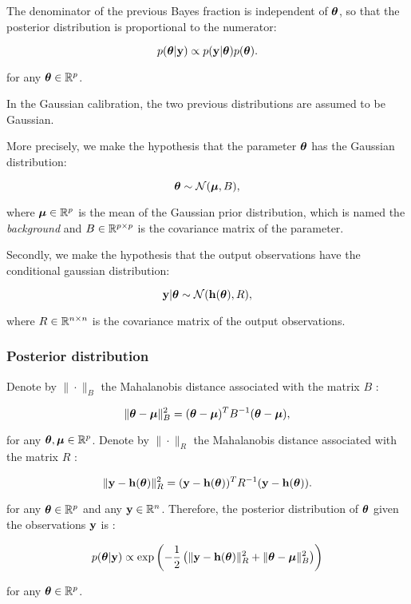\documentclass{beamer}
\begin{document}
\begin{frame}

The denominator of the previous Bayes fraction is independent of
$\boldsymbol{\theta}$, so that the posterior distribution is
proportional to the numerator:

$$
p(\boldsymbol{\theta} | {\bf y}) \propto  p({\bf y} | \boldsymbol{\theta}) p(\boldsymbol{\theta}).
$$

for any $\boldsymbol{\theta}\in\mathbb{R}^p$.

In the Gaussian calibration, the two previous distributions are assumed
to be Gaussian.

More precisely, we make the hypothesis that the parameter
$\boldsymbol{\theta}$ has the Gaussian distribution:

$$
\boldsymbol{\theta} \sim \mathcal{N}(\boldsymbol{\mu}, B),
$$

where $\boldsymbol{\mu}\in\mathbb{R}^p$ is the mean of the Gaussian prior
distribution, which is named the \emph{background} and
$B\in\mathbb{R}^{p \times p}$ is the covariance matrix of the
parameter.

\end{frame}

\begin{frame}
Secondly, we make the hypothesis that the output observations have the
conditional gaussian distribution:

$$
{\bf y} | \boldsymbol{\theta} \sim \mathcal{N}({\bf h}(\boldsymbol{\theta}), R),
$$

where $R\in\mathbb{R}^{n \times n}$ is the covariance matrix of the
output observations.
\end{frame}


\begin{frame}
\frametitle{Posterior distribution}

Denote by $\|\cdot\|_B$ the Mahalanobis distance associated with
the matrix $B$ :

$$
\|\boldsymbol{\theta}-\boldsymbol{\mu} \|^2_B = (\boldsymbol{\theta}-\boldsymbol{\mu} )^T B^{-1} (\boldsymbol{\theta}-\boldsymbol{\mu} ),
$$

for any $\boldsymbol{\theta},\boldsymbol{\mu} \in \mathbb{R}^p$. Denote by
$\|\cdot\|_R$ the Mahalanobis distance associated with the matrix
$R$ :

$$
\|{\bf y}-{\bf h}(\boldsymbol{\theta})\|^2_R = ({\bf y}-{\bf h}(\boldsymbol{\theta}))^T R^{-1} ({\bf y}-{\bf h}(\boldsymbol{\theta})).
$$

for any $\boldsymbol{\theta} \in \mathbb{R}^p$ and any
${\bf y} \in \mathbb{R}^{n}$. Therefore, the posterior distribution
of $\boldsymbol{\theta}$ given the observations ${\bf y}$ is :

$$
   p(\boldsymbol{\theta}|{\bf y}) \propto \exp\left( -\frac{1}{2} \left( \|{\bf y}-{\bf h}(\boldsymbol{\theta})\|^2_R 
   + \|\boldsymbol{\theta}-\boldsymbol{\mu} \|^2_B \right) \right)
$$

for any $\boldsymbol{\theta}\in\mathbb{R}^p$.
\end{frame}
\end{document}
